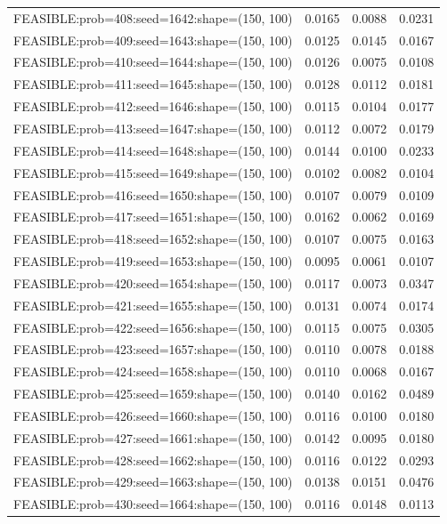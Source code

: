 \begin{longtable}{lccc}
FEASIBLE:prob=408:seed=1642:shape=(150, 100) &   0.0165 & 0.0088 & 0.0231 \\
FEASIBLE:prob=409:seed=1643:shape=(150, 100) &   0.0125 & 0.0145 & 0.0167 \\
FEASIBLE:prob=410:seed=1644:shape=(150, 100) &   0.0126 & 0.0075 & 0.0108 \\
FEASIBLE:prob=411:seed=1645:shape=(150, 100) &   0.0128 & 0.0112 & 0.0181 \\
FEASIBLE:prob=412:seed=1646:shape=(150, 100) &   0.0115 & 0.0104 & 0.0177 \\
FEASIBLE:prob=413:seed=1647:shape=(150, 100) &   0.0112 & 0.0072 & 0.0179 \\
FEASIBLE:prob=414:seed=1648:shape=(150, 100) &   0.0144 & 0.0100 & 0.0233 \\
FEASIBLE:prob=415:seed=1649:shape=(150, 100) &   0.0102 & 0.0082 & 0.0104 \\
FEASIBLE:prob=416:seed=1650:shape=(150, 100) &   0.0107 & 0.0079 & 0.0109 \\
FEASIBLE:prob=417:seed=1651:shape=(150, 100) &   0.0162 & 0.0062 & 0.0169 \\
FEASIBLE:prob=418:seed=1652:shape=(150, 100) &   0.0107 & 0.0075 & 0.0163 \\
FEASIBLE:prob=419:seed=1653:shape=(150, 100) &   0.0095 & 0.0061 & 0.0107 \\
FEASIBLE:prob=420:seed=1654:shape=(150, 100) &   0.0117 & 0.0073 & 0.0347 \\
FEASIBLE:prob=421:seed=1655:shape=(150, 100) &   0.0131 & 0.0074 & 0.0174 \\
FEASIBLE:prob=422:seed=1656:shape=(150, 100) &   0.0115 & 0.0075 & 0.0305 \\
FEASIBLE:prob=423:seed=1657:shape=(150, 100) &   0.0110 & 0.0078 & 0.0188 \\
FEASIBLE:prob=424:seed=1658:shape=(150, 100) &   0.0110 & 0.0068 & 0.0167 \\
FEASIBLE:prob=425:seed=1659:shape=(150, 100) &   0.0140 & 0.0162 & 0.0489 \\
FEASIBLE:prob=426:seed=1660:shape=(150, 100) &   0.0116 & 0.0100 & 0.0180 \\
FEASIBLE:prob=427:seed=1661:shape=(150, 100) &   0.0142 & 0.0095 & 0.0180 \\
FEASIBLE:prob=428:seed=1662:shape=(150, 100) &   0.0116 & 0.0122 & 0.0293 \\
FEASIBLE:prob=429:seed=1663:shape=(150, 100) &   0.0138 & 0.0151 & 0.0476 \\
FEASIBLE:prob=430:seed=1664:shape=(150, 100) &   0.0116 & 0.0148 & 0.0113 \\

\end{longtable}
